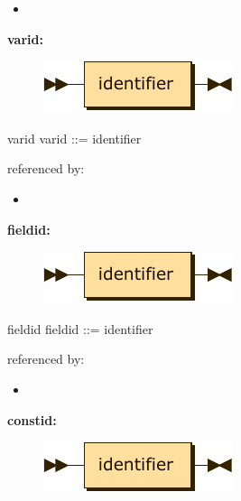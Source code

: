 \documentclass[10pt,a4paper,twoside]{article}
\providecommand{\tightlist}{%
  \setlength{\itemsep}{0pt}\setlength{\parskip}{0pt}}
\newcounter{grammarbox}[section]
\begin{document}
\begin{itemize}
\tightlist
\item
\end{itemize}

\textbf{varid:}

\begin{figure}[H]
\centering
\includegraphics{diagram/varid.pdf}

\end{figure}

\begin{grammarbox}{varid}
\vspace{0.5em}
varid    ::= identifier
\end{grammarbox}

referenced by:

\begin{itemize}
\tightlist
\item
\end{itemize}

\textbf{fieldid:}

\begin{figure}[H]
\centering
\includegraphics{diagram/fieldid.pdf}

\end{figure}

\begin{grammarbox}{fieldid}
\vspace{0.5em}
fieldid  ::= identifier
\end{grammarbox}

referenced by:

\begin{itemize}
\tightlist
\item
\end{itemize}

\textbf{constid:}

\begin{figure}[H]
\centering
\includegraphics{diagram/constid.pdf}

\end{figure}
\end{document}
